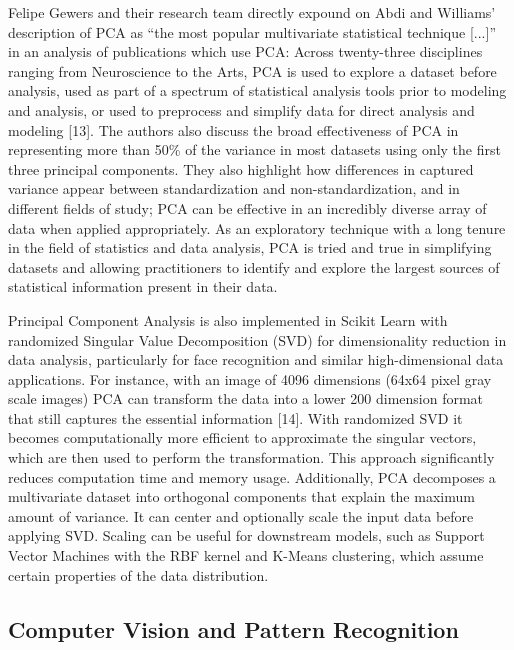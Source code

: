 \documentclass[
  letterpaper,
  DIV=11,
  numbers=noendperiod]{scrreprt}
\begin{document}
Felipe Gewers and their research team directly expound on Abdi and
Williams' description of PCA as ``the most popular multivariate
statistical technique {[}...{]}'' in an analysis of publications which
use PCA: Across twenty-three disciplines ranging from Neuroscience to
the Arts, PCA is used to explore a dataset before analysis, used as part
of a spectrum of statistical analysis tools prior to modeling and
analysis, or used to preprocess and simplify data for direct analysis
and modeling {[}13{]}. The authors also discuss the broad effectiveness
of PCA in representing more than 50\% of the variance in most datasets
using only the first three principal components. They also highlight how
differences in captured variance appear between standardization and
non-standardization, and in different fields of study; PCA can be
effective in an incredibly diverse array of data when applied
appropriately. As an exploratory technique with a long tenure in the
field of statistics and data analysis, PCA is tried and true in
simplifying datasets and allowing practitioners to identify and explore
the largest sources of statistical information present in their data.

Principal Component Analysis is also implemented in Scikit Learn with
randomized Singular Value Decomposition (SVD) for dimensionality
reduction in data analysis, particularly for face recognition and
similar high-dimensional data applications. For instance, with an image
of 4096 dimensions (64x64 pixel gray scale images) PCA can transform the
data into a lower 200 dimension format that still captures the essential
information {[}14{]}. With randomized SVD it becomes computationally
more efficient to approximate the singular vectors, which are then used
to perform the transformation. This approach significantly reduces
computation time and memory usage. Additionally, PCA decomposes a
multivariate dataset into orthogonal components that explain the maximum
amount of variance. It can center and optionally scale the input data
before applying SVD. Scaling can be useful for downstream models, such
as Support Vector Machines with the RBF kernel and K-Means clustering,
which assume certain properties of the data distribution.

\hypertarget{computer-vision-and-pattern-recognition}{%
\subsection{Computer Vision and Pattern
Recognition}\label{computer-vision-and-pattern-recognition}}
\end{document}

